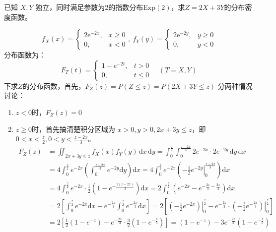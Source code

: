 ﻿\documentclass[lang=cn,11pt]{elegantbook}
\begin{document}
\begin{exercise}[$Z=AX+BY$型:] 已知 $X, Y$ 独立，同时满足参数为2的指数分布$\text{Exp}(2)$，求$Z=2X+3Y$的分布密度函数。
\end{exercise}
\begin{solution}
\[f_X(x)=\begin{cases}2\mathrm{e}^{-2x},&x\geqslant0\\0,&x<0\end{cases},~f_Y(y)=\begin{cases}2\mathrm{e}^{-2y},&y\geqslant0\\0,&y<0\end{cases}\]
分布函数为：\[F_T(t) =\begin{cases}1 - e^{-2t}, & t>0 \\0, & t\le 0\end{cases}\quad (T=X,Y)\]
下求$Z$的分布函数，首先，$F_{Z}(z)=P(Z\leqslant z)=P(2X+3Y\leqslant z)$
分两种情况讨论：
\begin{enumerate}
    \item $z<0$时，$F_{Z}(z)=0$
    \item $z\geqslant 0$时，首先搞清楚积分区域为 \( x>0,y>0, 2x+3y \le z \)，即 \( 0 < x < \frac{z}{2}, 0 < y < \frac{z-2x}{3} \)。
\begin{align*}
    F_{Z}(z)
    &= \iint_{2x+3y\leqslant z} f_X(x) f_Y(y) \,\mathrm{d}x\,\mathrm{d}y
    = \int_{0}^{\frac{z}{2}} \int_{0}^{\frac{z-2x}{3}} 2e^{-2x} \cdot 2e^{-2y}\,\mathrm{d}y\,\mathrm{d}x \\
    &= 4 \int_{0}^{\frac{z}{2}} e^{-2x} \left( \int_{0}^{\frac{z-2x}{3}} e^{-2y} \mathrm{d}y \right) \mathrm{d}x
    = 4 \int_{0}^{\frac{z}{2}} e^{-2x} \left( \left. -\frac{1}{2}e^{-2y} \right|_{0}^{\frac{z-2x}{3}} \right) \mathrm{d}x \\
    &= 4 \int_{0}^{\frac{z}{2}} e^{-2x} \cdot \frac{1}{2}\left( 1 - e^{-\frac{2(z-2x)}{3}} \right) \mathrm{d}x
    = 2 \int_{0}^{\frac{z}{2}} \left( e^{-2x} - e^{-\frac{2z}{3} - \frac{2x}{3}} \right) \mathrm{d}x \\
    &= 2\left[ \int_{0}^{\frac{z}{2}} e^{-2x} \mathrm{d}x - e^{-\frac{2z}{3}} \int_{0}^{\frac{z}{2}} e^{-\frac{2x}{3}} \mathrm{d}x \right] = 2\left[ \left. \left( -\frac{1}{2}e^{-2x} \right) \right|_{0}^{\frac{z}{2}} - e^{-\frac{2z}{3}} \cdot \left. \left( -\frac{3}{2}e^{-\frac{2x}{3}} \right) \right|_{0}^{\frac{z}{2}} \right] \\
    &= 2\left[ \frac{1}{2}\left( 1 - e^{-z} \right) - e^{-\frac{2z}{3}} \cdot \frac{3}{2}\left( 1 - e^{-\frac{z}{3}} \right) \right] = (1 - e^{-z}) - 3e^{-\frac{2z}{3}}\left( 1 - e^{-\frac{z}{3}} \right) \\

\end{align*}
\end{enumerate}
\end{solution}
\end{document}
